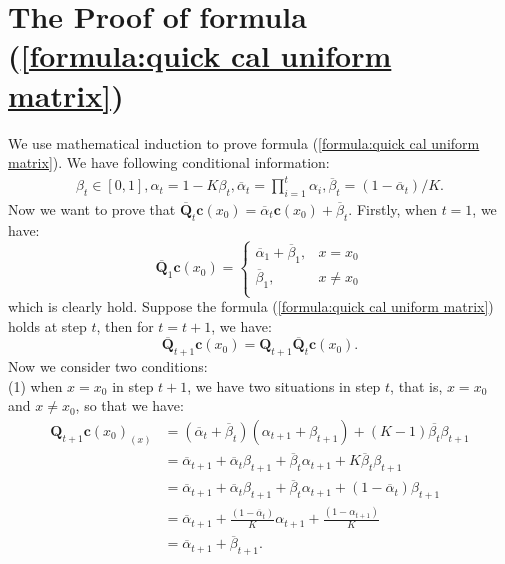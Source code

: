 \documentclass[lettersize,journal]{IEEEtran}
\begin{document}
\section{The Proof of formula (\ref{formula:quick cal uniform matrix})} \label{appendix1}
We use mathematical induction to prove formula (\ref{formula:quick cal uniform matrix}). We have following conditional information:
\begin{equation}\label{formula:proof1}
\begin{aligned}
   \beta_t \in [0,1], \alpha_t=1-K\beta_t,
   \overline{\alpha}_t=\prod_{i=1}^{t}\alpha_i, \overline{\beta}_t=(1- \overline{\alpha}_t)/K.
\end{aligned}
\end{equation}
Now we want to prove that $\overline{\boldsymbol{Q}}_t \boldsymbol{c}(x_0) = \overline{\alpha}_t \boldsymbol{c}(x_0) + \overline{\beta}_t$.
Firstly, when $t=1$, we have:
\begin{equation}\label{formula:proof1}
\overline{\boldsymbol{Q}}_1\boldsymbol{c}(x_0)=
\left\{
             \begin{array}{lr}
             \overline{\alpha}_1+\overline{\beta}_1, & x=x_0  \\
             \overline{\beta}_1, & x \neq x_0\\
             \end{array}
\right.
\end{equation}
which is clearly hold. Suppose the formula (\ref{formula:quick cal uniform matrix}) holds at step $t$, then for $t = t + 1$, we have:
$$
\overline{\boldsymbol{Q}}_{t+1} \boldsymbol{c}(x_0) = \boldsymbol{Q}_{t+1}\overline{\boldsymbol{Q}}_t \boldsymbol{c}(x_0).
$$
Now we consider two conditions: \\
(1) when $x=x_0$ in step $t+1$, we have two situations in step $t$, that is, $x=x_0$ and $x \neq x_0$, so that we have:
\begin{equation}\label{formula:proof2}
\begin{aligned}
  \boldsymbol{Q}_{t+1}\boldsymbol{c}(x_0)_{(x)}&=(\overline{\alpha}_t+\overline{\beta}_t)(\alpha_{t+1}+\beta_{t+1})+(K-1)\overline{\beta_t}\beta_{t+1} \\
  &=\overline{\alpha}_{t+1} +\overline{\alpha}_t\beta_{t+1}+\overline{\beta}_t\alpha_{t+1}+K\overline{\beta}_t\beta_{t+1} \\
  &= \overline{\alpha}_{t+1} + \overline{\alpha}_t\beta_{t+1}+\overline{\beta}_t\alpha_{t+1} + (1-\overline{\alpha}_t)\beta_{t+1} \\
  &= \overline{\alpha}_{t+1} + \frac{(1-\overline{\alpha}_t)}{K}\alpha_{t+1} + \frac{(1-\alpha_{t+1})}{K} \\
&= \overline{\alpha}_{t+1} + \overline{\beta}_{t+1}.
\end{aligned}
\end{equation}
\end{document}
